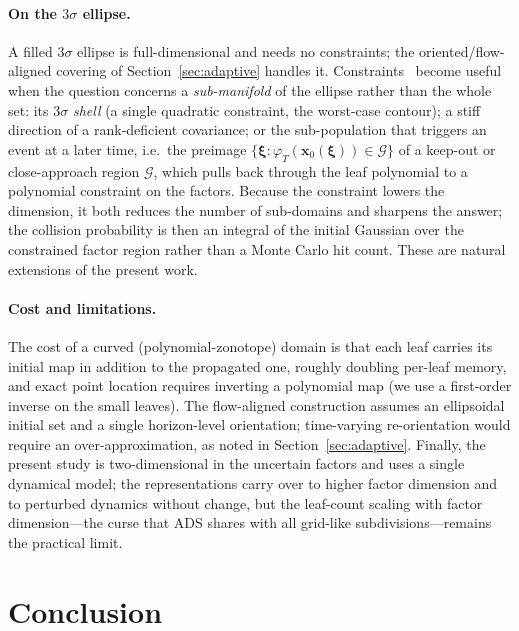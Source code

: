\documentclass[11pt]{article}
\newcommand{\bx}{\bm{x}}
\newcommand{\bxi}{\bm{\xi}}
\begin{document}
\paragraph{On the $3\sigma$ ellipse.}
A filled $3\sigma$ ellipse is full-dimensional and needs no constraints; the
oriented/flow-aligned covering of Section~\ref{sec:adaptive} handles it.
Constraints~\citep{scott2016constrained, kochdumper2023constrained} become useful
when the question concerns a \emph{sub-manifold} of the ellipse rather than the
whole set: its $3\sigma$ \emph{shell} (a single quadratic constraint, the
worst-case contour); a stiff direction of a rank-deficient covariance; or the
sub-population that triggers an event at a later time, i.e.\ the preimage
$\{\bxi : \varphi_T(\bx_0(\bxi)) \in \mathcal{G}\}$ of a keep-out or
close-approach region $\mathcal{G}$, which pulls back through the leaf polynomial
to a polynomial constraint on the factors. Because the constraint lowers the
dimension, it both reduces the number of sub-domains and sharpens the answer; the
collision probability is then an integral of the initial Gaussian over the
constrained factor region rather than a Monte Carlo hit count. These are natural
extensions of the present work.

\paragraph{Cost and limitations.}
The cost of a curved (polynomial-zonotope) domain is that each leaf carries its
initial map in addition to the propagated one, roughly doubling per-leaf memory,
and exact point location requires inverting a polynomial map (we use a
first-order inverse on the small leaves). The flow-aligned construction assumes
an ellipsoidal initial set and a single horizon-level orientation; time-varying
re-orientation would require an over-approximation, as noted in
Section~\ref{sec:adaptive}. Finally, the present study is two-dimensional in the
uncertain factors and uses a single dynamical model; the representations carry
over to higher factor dimension and to perturbed dynamics without change, but the
leaf-count scaling with factor dimension---the curse that ADS shares with all
grid-like subdivisions---remains the practical limit.

\section{Conclusion}
\end{document}
